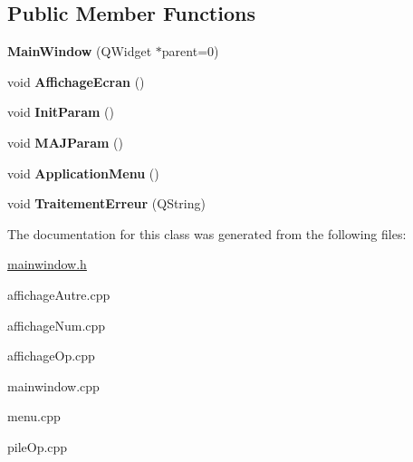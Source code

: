 \subsection*{Public Member Functions}
\begin{DoxyCompactItemize}
\item 
\hypertarget{class_main_window_a8b244be8b7b7db1b08de2a2acb9409db}{{\bfseries Main\-Window} (Q\-Widget $\ast$parent=0)}\label{class_main_window_a8b244be8b7b7db1b08de2a2acb9409db}

\item 
\hypertarget{class_main_window_ac78de1f17d1e936e0b5efa2b7d0e5804}{void {\bfseries Affichage\-Ecran} ()}\label{class_main_window_ac78de1f17d1e936e0b5efa2b7d0e5804}

\item 
\hypertarget{class_main_window_a19564c9faee3e04539c431230b0beb03}{void {\bfseries Init\-Param} ()}\label{class_main_window_a19564c9faee3e04539c431230b0beb03}

\item 
\hypertarget{class_main_window_af644382f0604f07829f789f2c807e06f}{void {\bfseries M\-A\-J\-Param} ()}\label{class_main_window_af644382f0604f07829f789f2c807e06f}

\item 
\hypertarget{class_main_window_a6cd67d43f112d2035d240b4f3f219b75}{void {\bfseries Application\-Menu} ()}\label{class_main_window_a6cd67d43f112d2035d240b4f3f219b75}

\item 
\hypertarget{class_main_window_ae7de56fcd961e099f6df85baab3b8022}{void {\bfseries Traitement\-Erreur} (Q\-String)}\label{class_main_window_ae7de56fcd961e099f6df85baab3b8022}

\end{DoxyCompactItemize}


The documentation for this class was generated from the following files\-:\begin{DoxyCompactItemize}
\item 
\hyperlink{mainwindow_8h}{mainwindow.\-h}\item 
affichage\-Autre.\-cpp\item 
affichage\-Num.\-cpp\item 
affichage\-Op.\-cpp\item 
mainwindow.\-cpp\item 
menu.\-cpp\item 
pile\-Op.\-cpp\end{DoxyCompactItemize}
